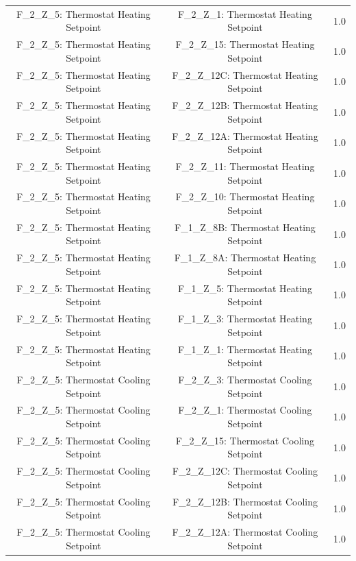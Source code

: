 \documentclass[aps, 10pt, a4paper]{article}
\begin{document}
\begin{longtable}{c|c||c}
                    F\_2\_Z\_5: Thermostat Heating Setpoint & F\_2\_Z\_1: Thermostat Heating Setpoint & 1.0 \\
                    F\_2\_Z\_5: Thermostat Heating Setpoint & F\_2\_Z\_15: Thermostat Heating Setpoint & 1.0 \\
                    F\_2\_Z\_5: Thermostat Heating Setpoint & F\_2\_Z\_12C: Thermostat Heating Setpoint & 1.0 \\
                    F\_2\_Z\_5: Thermostat Heating Setpoint & F\_2\_Z\_12B: Thermostat Heating Setpoint & 1.0 \\
                    F\_2\_Z\_5: Thermostat Heating Setpoint & F\_2\_Z\_12A: Thermostat Heating Setpoint & 1.0 \\
                    F\_2\_Z\_5: Thermostat Heating Setpoint & F\_2\_Z\_11: Thermostat Heating Setpoint & 1.0 \\
                    F\_2\_Z\_5: Thermostat Heating Setpoint & F\_2\_Z\_10: Thermostat Heating Setpoint & 1.0 \\
                    F\_2\_Z\_5: Thermostat Heating Setpoint & F\_1\_Z\_8B: Thermostat Heating Setpoint & 1.0 \\
                    F\_2\_Z\_5: Thermostat Heating Setpoint & F\_1\_Z\_8A: Thermostat Heating Setpoint & 1.0 \\
                    F\_2\_Z\_5: Thermostat Heating Setpoint & F\_1\_Z\_5: Thermostat Heating Setpoint & 1.0 \\
                    F\_2\_Z\_5: Thermostat Heating Setpoint & F\_1\_Z\_3: Thermostat Heating Setpoint & 1.0 \\
                    F\_2\_Z\_5: Thermostat Heating Setpoint & F\_1\_Z\_1: Thermostat Heating Setpoint & 1.0 \\
                    F\_2\_Z\_5: Thermostat Cooling Setpoint & F\_2\_Z\_3: Thermostat Cooling Setpoint & 1.0 \\
                    F\_2\_Z\_5: Thermostat Cooling Setpoint & F\_2\_Z\_1: Thermostat Cooling Setpoint & 1.0 \\
                    F\_2\_Z\_5: Thermostat Cooling Setpoint & F\_2\_Z\_15: Thermostat Cooling Setpoint & 1.0 \\
                    F\_2\_Z\_5: Thermostat Cooling Setpoint & F\_2\_Z\_12C: Thermostat Cooling Setpoint & 1.0 \\
                    F\_2\_Z\_5: Thermostat Cooling Setpoint & F\_2\_Z\_12B: Thermostat Cooling Setpoint & 1.0 \\
                    F\_2\_Z\_5: Thermostat Cooling Setpoint & F\_2\_Z\_12A: Thermostat Cooling Setpoint & 1.0 \\

\end{longtable}
\end{document}
